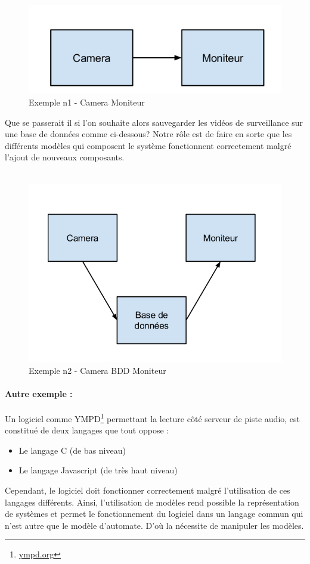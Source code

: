 \documentclass[12pt,a4paper]{report}
\begin{document}
\begin{figure}[h]
	\centering
	\includegraphics[scale=0.5]{ressources/camera-moniteur.png}
	\caption{Exemple n1 - Camera Moniteur}
\end{figure}
Que se passerait il si l'on souhaite alors sauvegarder les vidéos de surveillance sur une base de données comme ci-dessous?
Notre rôle est de faire en sorte que les différents modèles qui composent le système fonctionnent correctement malgré l'ajout de nouveaux composants. \\\\
\begin{figure}[!h]
	\centering
	\includegraphics[scale=0.5]{ressources/camera-bdd-moniteur.png}
	\caption{Exemple n2 - Camera BDD  Moniteur}
\end{figure}


\paragraph*{Autre exemple :\\}

Un logiciel comme YMPD\footnote{\href{http://www.ympd.org}{ympd.org}} permettant la lecture côté serveur de piste audio, est constitué de deux langages que tout oppose : \begin{itemize}
  \item Le langage C (de bas niveau)
  \item Le langage Javascript (de très haut niveau)
\end{itemize}
Cependant, le logiciel doit fonctionner correctement malgré l'utilisation de ces langages différents. 
Ainsi, l'utilisation de modèles rend possible la représentation de systèmes et permet 
le fonctionnement du logiciel dans un langage commun qui n'est autre que le modèle d'automate.
D'où la nécessite de manipuler les modèles.
\end{document}
